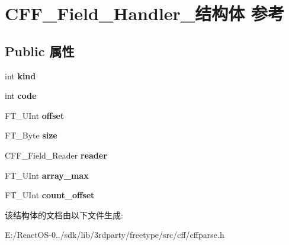 \hypertarget{struct_c_f_f___field___handler__}{}\section{C\+F\+F\+\_\+\+Field\+\_\+\+Handler\+\_\+结构体 参考}
\label{struct_c_f_f___field___handler__}
\subsection*{Public 属性}
\begin{DoxyCompactItemize}
\item 
\mbox{\label{struct_c_f_f___field___handler___a403fb3788882055e63849c1ca1e9c959}} 
int {\bfseries kind}
\item 
\mbox{\label{struct_c_f_f___field___handler___a70d4178039c2720da08822f380ec31c8}} 
int {\bfseries code}
\item 
\mbox{\label{struct_c_f_f___field___handler___a2a24a83aa90f7b2d7d64673d75c3d1fe}} 
F\+T\+\_\+\+U\+Int {\bfseries offset}
\item 
\mbox{\label{struct_c_f_f___field___handler___a71f4b89974c9741133df19ac89383f46}} 
F\+T\+\_\+\+Byte {\bfseries size}
\item 
\mbox{\label{struct_c_f_f___field___handler___aedbe5049d545a2fe7202fe1c62bb7bc1}} 
C\+F\+F\+\_\+\+Field\+\_\+\+Reader {\bfseries reader}
\item 
\mbox{\label{struct_c_f_f___field___handler___afc53c326b89889c447466043a189bc25}} 
F\+T\+\_\+\+U\+Int {\bfseries array\+\_\+max}
\item 
\mbox{\label{struct_c_f_f___field___handler___a4d11ee0a1da61c08d58144f9ec8fc6af}} 
F\+T\+\_\+\+U\+Int {\bfseries count\+\_\+offset}
\end{DoxyCompactItemize}


该结构体的文档由以下文件生成\+:\begin{DoxyCompactItemize}
\item 
E\+:/\+React\+O\+S-\/0../sdk/lib/3rdparty/freetype/src/cff/cffparse.\+h\end{DoxyCompactItemize}
